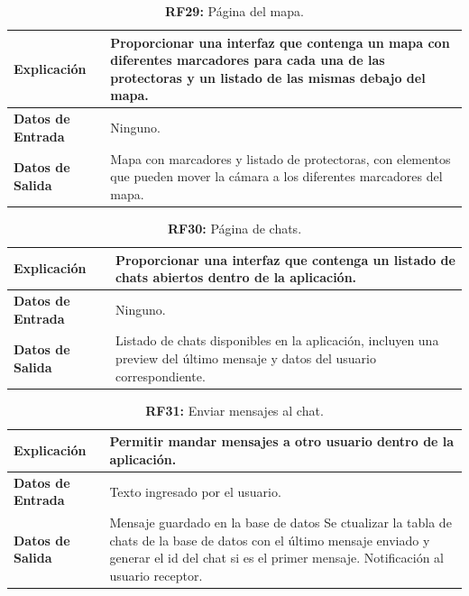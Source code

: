 \documentclass[a4paper, 12pt]{article}
\begin{document}
\begin{table}[H]
\captionsetup{justification=raggedright,singlelinecheck=false}
\caption{\textbf{RF29:} Página del mapa.}
\label{tab:RF29}
	\begin{tabular}{|m{5cm}|m{10cm}|}
	\hline
	\textbf{Explicación} & Proporcionar una interfaz que contenga un mapa con diferentes marcadores para cada una de las protectoras y un listado de las mismas debajo del mapa. \\ 
	\hline
	\textbf{Datos de Entrada} & Ninguno. \\ 
	\hline
	\textbf{Datos de Salida} & Mapa con marcadores y listado de protectoras, con elementos que pueden mover la cámara a los diferentes marcadores del mapa. \\ 
	\hline
\end{tabular}
\end{table}


\begin{table}[H]
\captionsetup{justification=raggedright,singlelinecheck=false}
\caption{\textbf{RF30:} Página de chats.}
\label{tab:RF30}
	\begin{tabular}{|m{5cm}|m{10cm}|}
	\hline
	\textbf{Explicación} & Proporcionar una interfaz que contenga un listado de chats abiertos dentro de la aplicación. \\ 
	\hline
	\textbf{Datos de Entrada} & Ninguno. \\ 
	\hline
	\textbf{Datos de Salida} & Listado de chats disponibles en la aplicación, incluyen una preview del último mensaje y datos del usuario correspondiente. \\ 
	\hline
\end{tabular}
\end{table}


\begin{table}[H]
\captionsetup{justification=raggedright,singlelinecheck=false}
\caption{\textbf{RF31:} Enviar mensajes al chat.}
\label{tab:RF31}
	\begin{tabular}{|m{5cm}|m{10cm}|}
	\hline
	\textbf{Explicación} & Permitir mandar mensajes a otro usuario dentro de la aplicación. \\ 
	\hline
	\textbf{Datos de Entrada} & Texto ingresado por el usuario. \\ 
	\hline
	\textbf{Datos de Salida} & Mensaje guardado en la base de datos Se ctualizar la tabla de chats de la base de datos con el último mensaje enviado y generar el id del chat si es el primer mensaje. Notificación al usuario receptor. \\ 
	\hline
\end{tabular}
\end{table}
\end{document}
